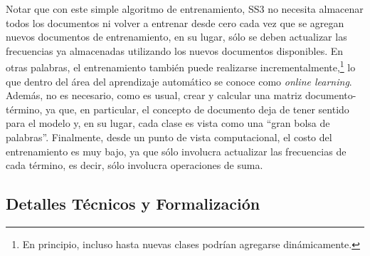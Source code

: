 Notar que con este simple algoritmo de entrenamiento, SS3 no necesita almacenar todos los documentos ni volver a entrenar desde cero cada vez que se agregan nuevos documentos de entrenamiento, en su lugar, sólo se deben actualizar las frecuencias ya almacenadas utilizando los nuevos documentos disponibles.
En otras palabras, el entrenamiento también puede realizarse incrementalmente,\footnote{En principio, incluso hasta nuevas clases podrían agregarse dinámicamente.} lo que dentro del área del aprendizaje automático se conoce como \emph{online learning}.
Además, no es necesario, como es usual, crear y calcular una matriz documento-término, ya que, en particular, el concepto de documento deja de tener sentido para el modelo y, en su lugar, cada clase es vista como una ``gran bolsa de palabras''.
Finalmente, desde un punto de vista computacional, el costo del entrenamiento es muy bajo, ya que sólo involucra actualizar las frecuencias de cada término, es decir, sólo involucra operaciones de suma.


\subsection{Detalles Técnicos y Formalización}
\label{sec:formal_description}

